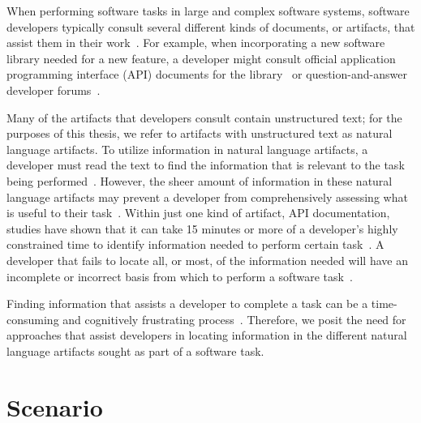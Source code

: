 

When performing software tasks in large and complex software systems, software developers typically consult several different kinds of documents, or artifacts, that assist them in their work~\cite{Starke2009, Meyer2017}. For example, 
when incorporating a new software library needed for a new feature, a developer might consult official application programming interface (API) documents for the library~\cite{robillard2011field, umarji2008archetypal} or 
 question-and-answer developer forums~\cite{parnin2012, silva2019}.



Many of the artifacts that developers consult
contain unstructured text; for the purposes of this thesis, we refer to artifacts with unstructured text as natural language artifacts.  
To utilize information in  natural language artifacts, a developer must read the text to find the information that is relevant to the task being performed~\cite{Bavota2016}.
However, 
the sheer amount of information in these natural language artifacts may prevent a developer from comprehensively assessing what is useful to their task~\cite{Murphy2005}.
Within just one kind of artifact, API
documentation, studies have shown that it can take 15 minutes or more
of a developer's highly constrained time to identify 
information needed to perform certain task~\cite{endrikat2014, Meyer2017}. 
A developer that fails to locate all, or most, of the information needed
will have an incomplete or incorrect basis from which to perform a software task~\cite{Murphy2005}.



Finding information that assists a developer to complete a task can be a time-consuming
 and cognitively frustrating process~\cite{Begel2008,
 robillard2011field}. Therefore, we posit the need for approaches that assist developers in locating information in the different natural language artifacts sought  as part of a software task.

 
 



 \section{Scenario}
 \label{cp1:example}
 
 
 
